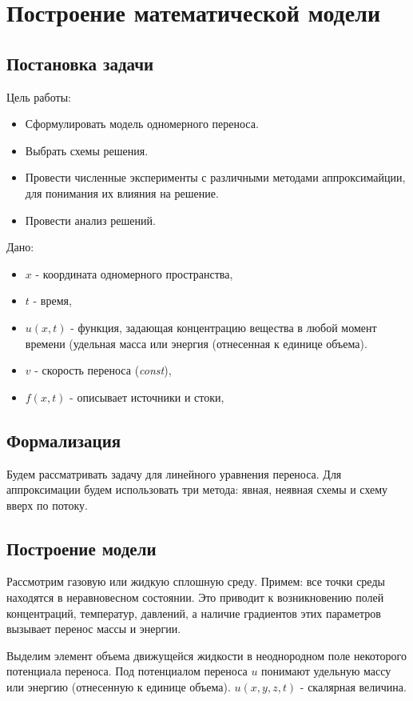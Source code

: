 \chapter{Построение математической модели}
\section{Постановка задачи}
Цель работы:
\begin{itemize}
	\item Сформулировать  модель одномерного переноса.
	\item Выбрать схемы решения.
	\item Провести численные эксперименты с различными методами аппроксимайции, для понимания их влияния на решение.
	\item Провести анализ решений.
\end{itemize}

Дано:
\begin{itemize}

	\item ${x}$ - координата одномерного пространства,
	\item $t$ - время,
		\item  $u(x,t)$ - функция, задающая концентрацию вещества в любой момент времени (удельная масса или
		энергия (отнесенная к единице объема). 
	\item $v $ - скорость переноса (\textit{const}),
	\item $f(x,t)$ - описывает источники и стоки,
\end{itemize}
\section{Формализация}
Будем рассматривать задачу для линейного уравнения переноса.
Для аппроксимации будем использовать три метода: явная, неявная схемы и схему вверх по потоку.

\newpage
\section{Построение модели}
Рассмотрим газовую или жидкую сплошную среду. Примем: все точки среды
находятся в неравновесном состоянии. Это приводит к возникновению полей
концентраций, температур, давлений, а наличие градиентов этих параметров вызывает
перенос массы и энергии.

Выделим элемент объема движущейся жидкости в неоднородном поле некоторого
потенциала переноса. Под потенциалом переноса
$u$ понимают удельную массу или
энергию (отнесенную к единице объема).
$u (x, y, z, t)$ - скалярная величина.

